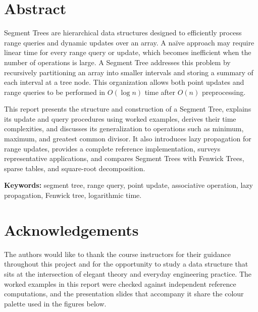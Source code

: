 \documentclass[
  11pt,
  a4paper,
  twoside=false,
  numbers=noenddot,
  headings=big,
  parskip=half,
  toc=bibliography,
  toc=listof,
  bibliography=totoc
]{scrreprt}
\newcounter{example}[chapter]
\begin{document}
\chapter*{Abstract}

Segment Trees are hierarchical data structures designed to efficiently process range queries and dynamic updates over an array. A na\"ive approach may require linear time for every range query or update, which becomes inefficient when the number of operations is large. A Segment Tree addresses this problem by recursively partitioning an array into smaller intervals and storing a summary of each interval at a tree node. This organization allows both point updates and range queries to be performed in $O(\log n)$ time after $O(n)$ preprocessing.

This report presents the structure and construction of a Segment Tree, explains its update and query procedures using worked examples, derives their time complexities, and discusses its generalization to operations such as minimum, maximum, and greatest common divisor. It also introduces lazy propagation for range updates, provides a complete reference implementation, surveys representative applications, and compares Segment Trees with Fenwick Trees, sparse tables, and square-root decomposition.

\bigskip
\noindent\textbf{\sffamily Keywords:} segment tree, range query, point update, associative operation, lazy propagation, Fenwick tree, logarithmic time.

\clearpage
\chapter*{Acknowledgements}

The authors would like to thank the course instructors for their guidance throughout this project and for the opportunity to study a data structure that sits at the intersection of elegant theory and everyday engineering practice. The worked examples in this report were checked against independent reference computations, and the presentation slides that accompany it share the colour palette used in the figures below.

\clearpage
\tableofcontents
\clearpage
\listoffigures
\clearpage
\listoftables
\clearpage
\end{document}
